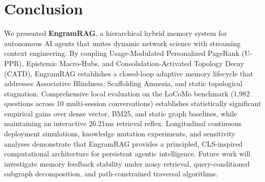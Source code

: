 \documentclass[conference]{IEEEtran}
\begin{document}
\section{Conclusion}

We presented \textbf{EngramRAG}, a hierarchical hybrid memory system for autonomous AI agents that unites dynamic network science with streaming context engineering. By coupling Usage-Modulated Personalized PageRank (U-PPR), Epistemic Macro-Hubs, and Consolidation-Activated Topology Decay (CATD), EngramRAG establishes a closed-loop adaptive memory lifecycle that addresses Associative Blindness, Scaffolding Amnesia, and static topological stagnation. Comprehensive local evaluation on the LoCoMo benchmark (1,982 questions across 10 multi-session conversations) establishes statistically significant empirical gains over dense vector, BM25, and static graph baselines, while maintaining an interactive 26.21ms retrieval reflex. Longitudinal continuous deployment simulations, knowledge mutation experiments, and sensitivity analyses demonstrate that EngramRAG provides a principled, CLS-inspired computational architecture for persistent agentic intelligence. Future work will investigate memory feedback stability under noisy retrieval, query-conditioned subgraph decomposition, and path-constrained traversal algorithms.
\enlargethispage{3\baselineskip}



\end{document}
